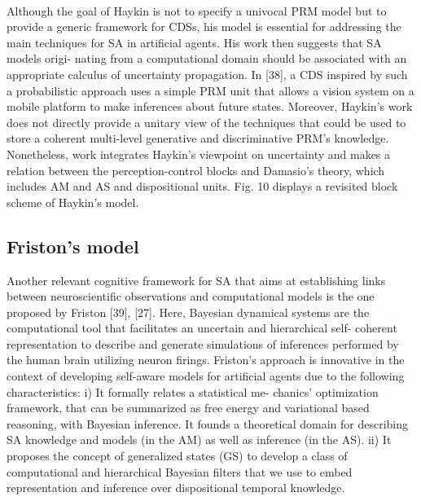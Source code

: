 \documentclass{article}
\begin{document}
		\paragraph{}Although the goal of Haykin is not to specify a univocal PRM model but to provide a generic framework for CDSs, his
		model is essential for addressing the main techniques for SA in artificial agents. His work then suggests that SA models origi-
		nating from a computational domain should be associated with an appropriate calculus of uncertainty propagation. In \citet{regazzoni-2020-multi-sensorial-generative-and-descriptive-self-awareness-models-for-autonomous-systems}[38], a CDS inspired by such a probabilistic approach uses a simple PRM unit that allows a vision system on a mobile platform to make inferences about future states. Moreover, Haykin’s work does not directly provide a unitary view of the techniques that could be used to store a coherent multi-level generative and discriminative PRM’s knowledge. Nonetheless, \cite{regazzoni-2020-multi-sensorial-generative-and-descriptive-self-awareness-models-for-autonomous-systems} work
		integrates Haykin’s viewpoint on uncertainty and makes a relation between the perception-control blocks and Damasio’s
		theory, which includes AM and AS and dispositional units.
		\cite{regazzoni-2020-multi-sensorial-generative-and-descriptive-self-awareness-models-for-autonomous-systems}Fig. 10 displays a revisited block scheme of Haykin’s model.
		
		\subsection{Friston’s model}
		Another relevant cognitive framework for SA that aims at
		establishing links between neuroscientific observations and
		computational models is the one proposed by Friston [39],
		\citet{regazzoni-2020-multi-sensorial-generative-and-descriptive-self-awareness-models-for-autonomous-systems}[27]. Here, Bayesian dynamical systems are the computational
		tool that facilitates an uncertain and hierarchical self-
		coherent representation to describe and generate simulations
		of inferences performed by the human brain utilizing neuron
		firings. Friston’s approach is innovative in the context of
		developing self-aware models for artificial agents due to the
		following characteristics: i) It formally relates a statistical me-
		chanics’ optimization framework, that can be summarized as
		free energy and variational based reasoning, with Bayesian
		inference. It founds a theoretical domain for describing SA
		knowledge and models (in the AM) as well as inference (in
		the AS). ii) It proposes the concept of generalized states (GS)
		to develop a class of computational and hierarchical Bayesian
		filters that we use to embed representation and inference over
		dispositional temporal knowledge.
\end{document}
